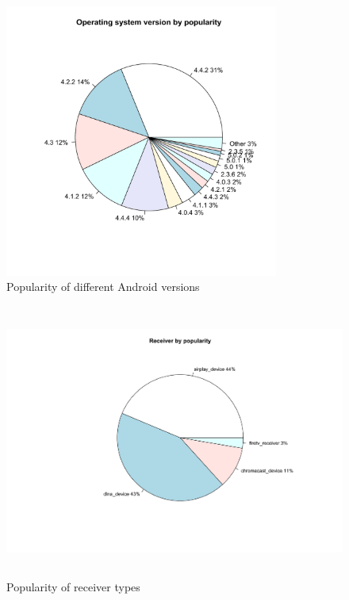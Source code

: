 \\
\begin{figure}[htb]
\centering \includegraphics[height=9cm]{charts/os_version_popularity}
\caption{Popularity of different Android versions \label{os_versions}}
\end{figure}



\begin{figure}[htb]
\centering \includegraphics[height=9cm]{charts/receiver_popularity}
\caption{Popularity of receiver types \label{receiver_types}}
\end{figure}




